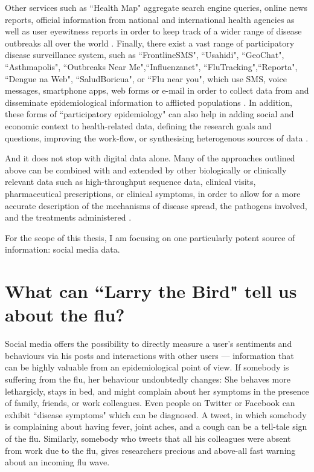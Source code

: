 \documentclass[11pt, a4paper,twoside]{report}\usepackage[]{graphicx}\usepackage[]{color}
\begin{document}
Other services such as ``Health Map" aggregate search engine queries, online news reports, official information from national and international health agencies as well as user eyewitness reports in order to keep track of a wider range of disease outbreaks all over the world \citep{brownstein_surveillance_2008,freifeld_healthmap:_2008}. Finally, there exist a vast range of participatory disease surveillance system, such as ``FrontlineSMS", ``Usahidi", ``GeoChat", ``Asthmapolis", ``Outbreaks Near Me",``Influenzanet", ``FluTracking",``Reporta", ``Dengue na Web", ``SaludBoricua", or ``Flu near you", which use SMS, voice messages, smartphone apps, web forms or e-mail in order to collect data from and disseminate epidemiological information to afflicted populations \citep{freifeld_participatory_2010,chunara_flu_2013,wojcik_public_2014,chunara_estimating_2015}. In addition, these forms of ``participatory epidemiology" can also help in adding social and economic context to health-related data, defining the research goals and questions, improving the work-flow, or synthesising heterogenous sources of data \citep{bach_participatory_2017,liu_assessing_2017}.

And it does not stop with digital data alone. Many of the approaches outlined above can be combined with and extended by other biologically or clinically relevant data such as high-throughput sequence data, clinical visits, pharmaceutical prescriptions, or clinical symptoms, in order to allow for a more accurate description of the mechanisms of disease spread, the pathogens involved, and the treatments administered \citep{ray_network_2016}.

For the scope of this thesis, I am focusing on one particularly potent source of information: social media data.

\section{What can ``Larry the Bird" tell us about the flu?}
Social media offers the possibility to directly measure a user's sentiments and behaviours via his posts and interactions with other users --- information that can be highly valuable from an epidemiological point of view. If somebody is suffering from the flu, her behaviour undoubtedly changes: She behaves more lethargicly, stays in bed, and might complain about her symptoms in the presence of family, friends, or work colleagues. Even people on Twitter or Facebook can exhibit ``disease symptoms" which can be diagnosed. A tweet, in which somebody is complaining about having fever, joint aches, and a cough can be a tell-tale sign of the flu. Similarly, somebody who tweets that all his colleagues were absent from work due to the flu, gives researchers precious and above-all fast warning about an incoming flu wave.
\end{document}
